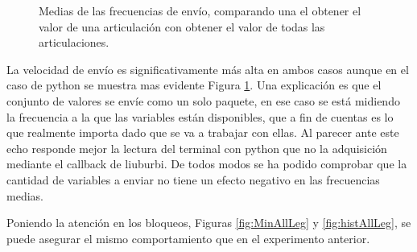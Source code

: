 \documentclass[12pt,a4paper,final,twoside]{article}
\begin{document}
\begin{figure}[H]
	\centering
{}
	 \caption{Medias de las frecuencias de envío, comparando una el obtener el valor de una articulación con obtener el valor de todas las articulaciones.}
  \label{fig:compAllOne}
\end{figure}
La velocidad de envío es significativamente más alta en ambos casos aunque en el caso de python se muestra mas evidente Figura \ref{fig:compAllOne}. Una explicación es que el conjunto de valores se envíe como un solo paquete, en ese caso se está midiendo la frecuencia a la que las variables están disponibles, que a fin de cuentas es lo que realmente importa dado que se va a trabajar con ellas. Al parecer ante este echo responde mejor la lectura del terminal con python que no la adquisición mediante el callback de liuburbi. De todos modos se ha podido comprobar que la cantidad de variables a enviar no tiene un efecto negativo en las frecuencias medias.

Poniendo la atención en los bloqueos, Figuras \ref{fig:MinAllLeg} y \ref{fig:histAllLeg}, se puede asegurar el mismo comportamiento que en el experimento anterior. 
\end{document}

